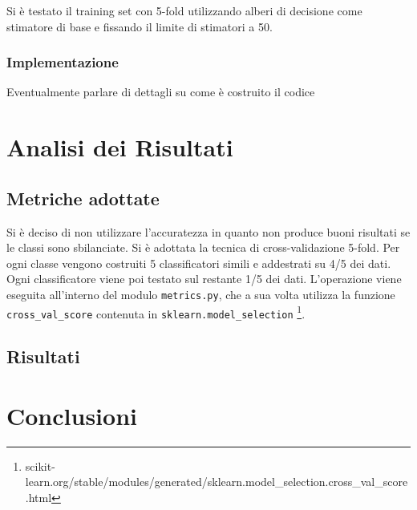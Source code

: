 \documentclass[12pt,a4paper,oneside,hidelinks]{report}
\begin{document}
Si è testato il training set con 5-fold utilizzando alberi di decisione come stimatore di base e fissando il limite di stimatori a 50.

\subsection{Implementazione}
Eventualmente parlare di dettagli su come è costruito il codice

\chapter{Analisi dei Risultati}
\label{chap:risultati}

\section{Metriche adottate}
Si è deciso di non utilizzare l'accuratezza in quanto non produce buoni risultati se le classi sono sbilanciate.  
Si è adottata la tecnica di cross-validazione 5-fold. Per ogni classe vengono costruiti 5 classificatori simili e addestrati su 4/5 dei dati. Ogni classificatore viene poi testato sul restante 1/5 dei dati.
L'operazione viene eseguita all'interno del modulo \texttt{metrics.py}, 
che a sua volta utilizza la funzione \texttt{cross\_val\_score} contenuta in 
\texttt{sklearn.model\_selection} 
\footnote{scikit-learn.org/stable/modules/generated/sklearn.model\_selection.cross\_val\_score.html}. 

\section{Risultati}

\chapter{Conclusioni}
\end{document}
